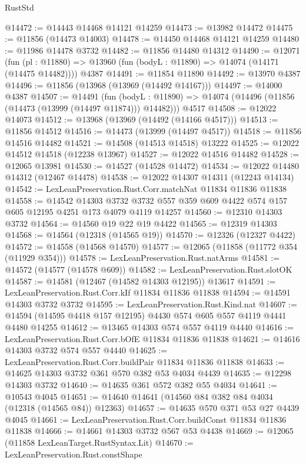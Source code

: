 \begin{lexlean}{RustStd}
\begin{coremodule}
@14472 := @14443 @14468 @14121 @14259
@14473 := @13982 @14472
@14475 := @11856 (@14473 @14003)
@14478 := @14450 @14468 @14121 @14259
@14480 := @11986 @14478 @3732
@14482 := @11856 @14480 @14312
@14490 := @12071
    (fun (pl : @11880) => @13960 (fun (bodyL : @11890) => @14074 (@14171 (@14475 @14482))))
    @4387
@14491 := @11854 @11890
@14492 := @13970 @4387
@14496 := @11856 (@13968 (@13969 (@14492 @14167)))
@14497 := @14000 @4387
@14507 := @14491
    (fun (bodyL : @11890) => @14074 (@14496 (@11856 (@14473 (@13999 (@14497 @11874))) @14482)))
    @4517
@14508 := @12022 @14073
@14512 := @13968 (@13969 (@14492 (@14166 @4517)))
@14513 := @11856 @14512
@14516 := @14473 (@13999 (@14497 @4517))
@14518 := @11856 @14516 @14482
@14521 := @14508 (@14513 @14518) @13222
@14525 := @12022 @14512 @14518 (@12238 @13967)
@14527 := @12022 @14516 @14482
@14528 := @12065 @13981
@14530 := @14527 (@14528 @14472)
@14534 := @12022 @14480 @14312 (@12467 @14478)
@14538 := @12022 @14307 @14311 (@12243 @14134)
@14542 := LexLeanPreservation.Rust.Corr.matchNat @11834 @11836 @11838
@14558 := @14542
    @14303
    @3732
    @3732
    @557
    @359
    @609
    @4422
    @574
    @157
    @605
    @12195
    @4251
    @173
    @4079
    @4119
    @14257
@14560 := @12310 @14303 @3732
@14564 := @14560 @19 @22 @19 @4422
@14565 := @12319 @14303
@14568 := @14564 (@12318 (@14565 @19))
@14570 := @12326 (@12327 @4422)
@14572 := @14558 (@14568 @14570)
@14577 := @12065 (@11858 (@11772 @354 (@11929 @354)))
@14578 := LexLeanPreservation.Rust.natArms
@14581 := @14572 (@14577 (@14578 @609))
@14582 := LexLeanPreservation.Rust.slotOK
@14587 := @14581 (@12467 (@14582 @14303 @12195)) @13617
@14591 := LexLeanPreservation.Rust.Corr.kIf @11834 @11836 @11838
@14594 := @14591 @14303 @3732 @3732
@14595 := LexLeanPreservation.Rust.Kind.nat
@14607 := @14594 (@14595 @4418 @157 @12195) @4430 @574 @605 @557 @4119 @4441 @4480 @14255
@14612 := @13465 @14303 @574 @557 @4119 @4440
@14616 := LexLeanPreservation.Rust.Corr.bOfE @11834 @11836 @11838
@14621 := @14616 @14303 @3732 @574 @557 @4440
@14625 := LexLeanPreservation.Rust.Corr.buildPair @11834 @11836 @11838
@14633 := @14625 @14303 @3732 @361 @570 @382 @53 @4034 @4439
@14635 := @12298 @14303 @3732
@14640 := @14635 @361 @572 @382 @55 @4034
@14641 := @10543 @4045
@14651 := @14640 @14641 (@14560 @84 @382 @84 @4034 (@12318 (@14565 @84)) @12363)
@14657 := @14635 @570 @371 @53 @27 @4439 @4045
@14661 := LexLeanPreservation.Rust.Corr.buildConst @11834 @11836 @11838
@14666 := @14661 @14303 @3732 @567 @53 @4438
@14669 := @12065 (@11858 LexLeanTarget.RustSyntax.Lit)
@14670 := LexLeanPreservation.Rust.constShape

\end{coremodule}
\end{lexlean}
